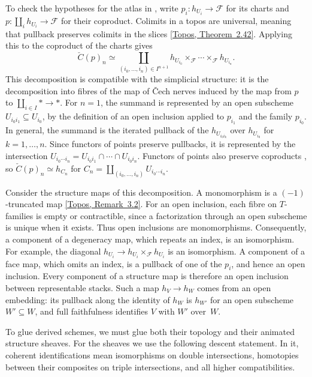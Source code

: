 To check the hypotheses for the atlas in
, write $p_i\colon h_{U_i}\to\mathcal F$
for its charts and $p\colon\coprod_i h_{U_i}\to\mathcal F$ for their
coproduct. Colimits in a topos are universal, meaning that pullback
preserves colimits in the slices
\href{https://animarium.org/tag/0219/}{[Topos, Theorem~2.42]}.
Applying this to the coproduct of the charts gives
\[
 \check C(p)_n\simeq\coprod_{(i_0,\ldots,i_n)\in I^{n+1}}
 h_{U_{i_0}}\times_{\mathcal F}\cdots\times_{\mathcal F}h_{U_{i_n}}.
\]
This decomposition is compatible with the simplicial structure: it is
the decomposition into fibres of the map of \v{C}ech nerves induced by
the map from $p$ to $\coprod_{i\in I}*\to*$. For $n=1$, the summand is
represented by an open subscheme $U_{i_0i_1}\subseteq U_{i_0}$, by the
definition of an open inclusion applied to $p_{i_1}$ and the family
$p_{i_0}$. In general, the summand is the iterated pullback of the
$h_{U_{i_0i_k}}$ over $h_{U_{i_0}}$ for $k=1,\ldots,n$. Since functors
of points preserve pullbacks, it is represented by the intersection
$U_{i_0\cdots i_n}=U_{i_0i_1}\cap\cdots\cap U_{i_0i_n}$. Functors of points
also preserve coproducts
\cite[Proposition~2.1.35(3)]{Steffens_Representability_Elliptic_Moduli},
so $\check C(p)_n\simeq h_{C_n}$ for
$C_n=\coprod_{(i_0,\ldots,i_n)}U_{i_0\cdots i_n}$.

Consider the structure maps of this decomposition. A monomorphism is a
$(-1)$-truncated map \href{https://animarium.org/tag/021N/}{[Topos, Remark~3.2]}.
For an open inclusion, each fibre on $T$-families is empty or
contractible, since a factorization through an open subscheme is unique
when it exists. Thus open inclusions are monomorphisms. Consequently, a component of a degeneracy map, which
repeats an index, is an isomorphism. For example, the diagonal
$h_{U_i}\to h_{U_i}\times_{\mathcal F}h_{U_i}$ is an isomorphism.
A component of a face map, which omits an index, is a pullback of one
of the $p_i$, and hence an open inclusion. Every component of a
structure map is therefore an open inclusion between representable
stacks. Such a map $h_V\to h_W$ comes from an open embedding: its
pullback along the identity of $h_W$ is $h_{W'}$ for an open subscheme
$W'\subseteq W$, and full faithfulness identifies $V$ with $W'$ over~$W$.

To glue derived schemes, we must glue both their topology and their
animated structure sheaves. For the sheaves we use the following
descent statement. In it, coherent identifications mean
isomorphisms on double intersections, homotopies between their
composites on triple intersections, and all higher compatibilities.

